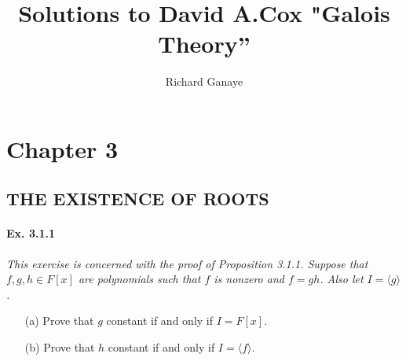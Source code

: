\documentclass[11pt,a4paper]{article}
\title{Solutions to David A.Cox  "Galois Theory''}
\author{Richard Ganaye}
\begin{document}
\maketitle


\section{Chapter 3}

\subsection{THE EXISTENCE OF ROOTS}

\paragraph{Ex. 3.1.1}

{\it This exercise is concerned with the proof of Proposition 3.1.1. Suppose that $f,g,h \in F[x]$ are polynomials such that $f$ is nonzero and $f=gh$. Also let $I = \langle g \rangle$.
\begin{enumerate}
\item[(a)] Prove that $g$ constant if and only if $I = F[x]$.
\item[(b)] Prove that $h$ constant if and only if $I = \langle f \rangle$.
\end{enumerate}
}
\end{document}
